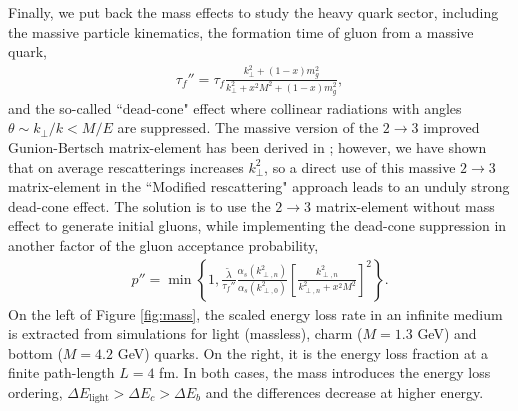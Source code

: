 \documentclass[aps, prc, reprint, amsmath, groupedaddress, nofootinbib]{revtex4-1}
\begin{document}
Finally, we put back the mass effects to study the heavy quark sector, including the massive particle kinematics, the formation time of gluon from a massive quark,
\begin{eqnarray}
\tau_{f}'' = \tau_f \frac{k_\perp^2 + (1-x)m_g^2}{k_\perp^2 + x^2M^2 + (1-x)m_g^2},
\end{eqnarray}
and the so-called ``dead-cone" effect where collinear radiations with angles $\theta \sim k_\perp/k < M/E$ are suppressed. 
The massive version of the $2\rightarrow3$ improved Gunion-Bertsch matrix-element has been derived in \cite{Uphoff:2014hza}; however, we have shown that on average rescatterings increases $k_{\perp}^2$, so a direct use of this massive $2\rightarrow3$ matrix-element in the ``Modified rescattering" approach leads to an unduly strong dead-cone effect.
The solution is to use the $2\rightarrow3$ matrix-element without mass effect to generate initial gluons, while implementing the dead-cone suppression in another factor of the gluon acceptance probability,
\begin{eqnarray}
p'' = \min\left\{1, \frac{\tilde{\lambda}}{\tau_f''}\frac{\alpha_s(k_{\perp,n}^2)}{\alpha_s(k_{\perp,0}^2)} \left[\frac{k_{\perp,n}^2}{k_{\perp,n}^2+x^2 M^2}\right]^2\right\}.
\end{eqnarray}
On the left of Figure \ref{fig:mass}, the scaled energy loss rate in an infinite medium is extracted from simulations for light (massless), charm ($M=1.3$ GeV) and bottom ($M=4.2$ GeV) quarks. 
On the right, it is the energy loss fraction at a finite path-length $L=4$ fm.
In both cases, the mass introduces the energy loss ordering, $\Delta E_{\textrm{light}} > \Delta E_c > \Delta E_b$ and the differences decrease at higher energy.
\end{document}
